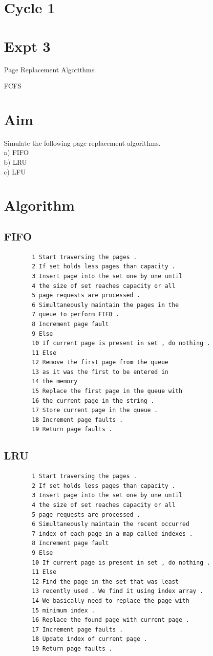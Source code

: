 \documentclass[13pt,oneside]{book}
\begin{document}
				\section*{Cycle 1}
\section*{Expt 3}
\begin{center}
    \Large{Page Replacement Algorithms}
\end{center}FCFS
\section*{Aim}
\large
Simulate the following page replacement algorithms.\\
a) FIFO\\
b) LRU \\
c) LFU \\

\section*{Algorithm}
    \subsection*{FIFO}
    \begin{verbatim}
		1 Start traversing the pages .
		2 If set holds less pages than capacity .
		3 Insert page into the set one by one until
		4 the size of set reaches capacity or all
		5 page requests are processed .
		6 Simultaneously maintain the pages in the
		7 queue to perform FIFO .
		8 Increment page fault
		9 Else
		10 If current page is present in set , do nothing .
		11 Else
		12 Remove the first page from the queue
		13 as it was the first to be entered in
		14 the memory
		15 Replace the first page in the queue with
		16 the current page in the string .
		17 Store current page in the queue .
		18 Increment page faults .
		19 Return page faults .
    \end{verbatim}  
    \subsection*{LRU}
    \begin{verbatim}
        1 Start traversing the pages .
		2 If set holds less pages than capacity .
		3 Insert page into the set one by one until
		4 the size of set reaches capacity or all
		5 page requests are processed .
		6 Simultaneously maintain the recent occurred
		7 index of each page in a map called indexes .
		8 Increment page fault
		9 Else
		10 If current page is present in set , do nothing .
		11 Else
		12 Find the page in the set that was least
		13 recently used . We find it using index array .
		14 We basically need to replace the page with
		15 minimum index .
		16 Replace the found page with current page .
		17 Increment page faults .
		18 Update index of current page .
		19 Return page faults .
    \end{verbatim}
\end{document}

